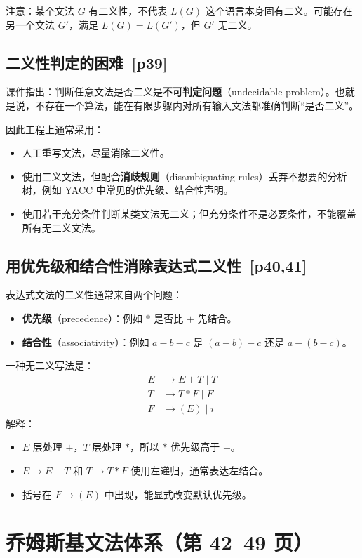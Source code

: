\documentclass[UTF8,fontset=none,11pt]{ctexart}
\newcommand{\pg}[1]{\texorpdfstring{{\small\color{graytext}\,[p#1]}}{ [p#1]}}
\newcommand{\term}[2]{\textbf{#1}（#2）}
\begin{document}
注意：某个文法 \(G\) 有二义性，不代表 \(L(G)\) 这个语言本身固有二义。可能存在另一个文法 \(G'\)，满足 \(L(G)=L(G')\)，但 \(G'\) 无二义。

\subsection{二义性判定的困难 \pg{39}}
课件指出：判断任意文法是否二义是\term{不可判定问题}{undecidable problem}。也就是说，不存在一个算法，能在有限步骤内对所有输入文法都准确判断“是否二义”。

因此工程上通常采用：
\begin{itemize}
  \item 人工重写文法，尽量消除二义性。
  \item 使用二义文法，但配合\term{消歧规则}{disambiguating rules}丢弃不想要的分析树，例如 YACC 中常见的优先级、结合性声明。
  \item 使用若干充分条件判断某类文法无二义；但充分条件不是必要条件，不能覆盖所有无二义文法。
\end{itemize}

\subsection{用优先级和结合性消除表达式二义性 \pg{40,41}}
表达式文法的二义性通常来自两个问题：
\begin{itemize}
  \item \term{优先级}{precedence}：例如 \(*\) 是否比 \(+\) 先结合。
  \item \term{结合性}{associativity}：例如 \(a-b-c\) 是 \((a-b)-c\) 还是 \(a-(b-c)\)。
\end{itemize}

一种无二义写法是：
\[
\begin{aligned}
E &\to E+T \mid T\\
T &\to T*F \mid F\\
F &\to (E)\mid i
\end{aligned}
\]
解释：
\begin{itemize}
  \item \(E\) 层处理 \(+\)，\(T\) 层处理 \(*\)，所以 \(*\) 优先级高于 \(+\)。
  \item \(E\to E+T\) 和 \(T\to T*F\) 使用左递归，通常表达左结合。
  \item 括号在 \(F\to(E)\) 中出现，能显式改变默认优先级。
\end{itemize}

\section{乔姆斯基文法体系（第 42--49 页）}
\end{document}
